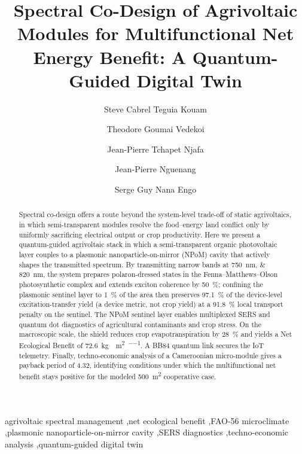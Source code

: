 \documentclass[preprint,12pt]{elsarticle}
\begin{document}
\linenumbers

\begin{frontmatter}

\title{Spectral Co-Design of Agrivoltaic Modules for Multifunctional Net Energy Benefit: A Quantum-Guided Digital Twin}

\author[udla]{Steve Cabrel Teguia Kouam}
\author[uy1]{Theodore Goumai Vedekoi}
\author[uy1]{Jean-Pierre Tchapet Njafa}
\author[udla]{Jean-Pierre Nguenang}
\author[uy1]{Serge Guy Nana Engo}


\address[udla]{Department of Physics, Faculty of Science, University of Douala, Cameroon}
\address[uy1]{Department of Physics, Faculty of Science, University of Yaound\'{e} I, Cameroon}

\begin{abstract}
Spectral co-design offers a route beyond the system-level trade-off of static agrivoltaics, in which semi-transparent modules resolve the food--energy land conflict only by uniformly sacrificing electrical output or crop productivity. Here we present a quantum-guided agrivoltaic stack in which a semi-transparent organic photovoltaic layer couples to a plasmonic nanoparticle-on-mirror (NPoM) cavity that actively shapes the transmitted spectrum. By transmitting narrow bands at \qtylist{750;820}{\nm}, the system prepares polaron-dressed states in the Fenna--Matthews--Olson photosynthetic complex and extends exciton coherence by \qty{50}{\percent}; confining the plasmonic sentinel layer to \qty{1}{\percent} of the area then preserves \qty{97.1}{\percent} of the device-level excitation-transfer yield (a device metric, not crop yield) at a \qty{91.8}{\percent} local transport penalty on the sentinel. The NPoM sentinel layer enables multiplexed SERS and quantum dot diagnostics of agricultural contaminants and crop stress. On the macroscopic scale, the shield reduces crop evapotranspiration by \qty{28}{\percent} and yields a Net Ecological Benefit of \qty{72.6}{\kg{}\per\m\squared\per\yr}. A BB84 quantum link secures the IoT telemetry. Finally, techno-economic analysis of a Cameroonian micro-module gives a payback period of \qty{4.32}{\yr}, identifying conditions under which the multifunctional net benefit stays positive for the modeled \qty{500}{\m\squared} cooperative case.
\end{abstract}

\begin{keyword}
agrivoltaic spectral management \sep net ecological benefit \sep FAO-56 microclimate \sep plasmonic nanoparticle-on-mirror cavity \sep SERS diagnostics \sep techno-economic analysis \sep quantum-guided digital twin
\end{keyword}

\end{frontmatter}
\end{document}
